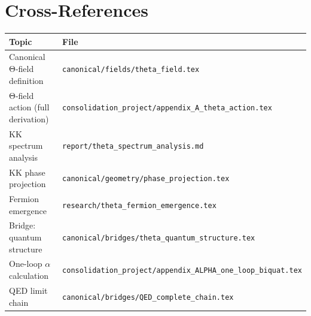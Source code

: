 \documentclass[11pt,a4paper]{article}
\begin{document}
\section{Cross-References}
\label{sec:xref}

\begin{tabular}{ll}
\hline
Topic & File \\
\hline
Canonical Θ-field definition & \texttt{canonical/fields/theta\_field.tex} \\
Θ-field action (full derivation) & \texttt{consolidation\_project/appendix\_A\_theta\_action.tex} \\
KK spectrum analysis & \texttt{report/theta\_spectrum\_analysis.md} \\
KK phase projection & \texttt{canonical/geometry/phase\_projection.tex} \\
Fermion emergence & \texttt{research/theta\_fermion\_emergence.tex} \\
Bridge: quantum structure & \texttt{canonical/bridges/theta\_quantum\_structure.tex} \\
One-loop $\alpha$ calculation & \texttt{consolidation\_project/appendix\_ALPHA\_one\_loop\_biquat.tex} \\
QED limit chain & \texttt{canonical/bridges/QED\_complete\_chain.tex} \\
\hline
\end{tabular}
\end{document}
